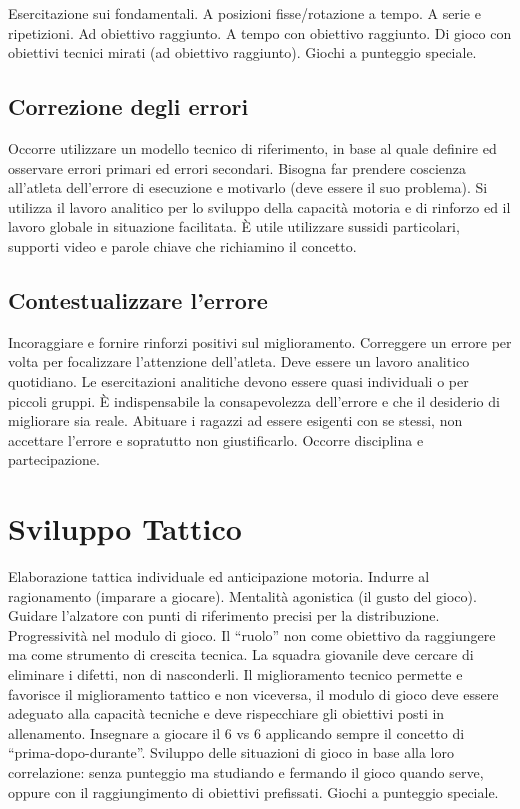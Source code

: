 Esercitazione sui fondamentali.
A posizioni fisse/rotazione a tempo.
A serie e ripetizioni.
Ad obiettivo raggiunto.
A tempo con obiettivo raggiunto.
Di gioco con obiettivi tecnici mirati (ad obiettivo raggiunto).
Giochi a punteggio speciale.

\subsection{Correzione degli errori}
Occorre utilizzare un modello tecnico di riferimento, in base al quale definire ed osservare errori primari ed errori secondari. Bisogna far prendere coscienza all'atleta dell'errore di esecuzione e motivarlo (deve essere il suo problema). Si utilizza il lavoro analitico per lo sviluppo della capacità motoria e di rinforzo ed il lavoro globale in situazione facilitata.
\`E utile utilizzare sussidi particolari, supporti video e parole chiave che richiamino il concetto.

\subsection{Contestualizzare l'errore}
Incoraggiare e fornire rinforzi positivi sul miglioramento. Correggere un errore per volta per focalizzare l'attenzione dell'atleta. Deve essere un lavoro analitico quotidiano.
Le esercitazioni analitiche devono essere quasi individuali o per piccoli gruppi.
\`E indispensabile la consapevolezza dell'errore e che il desiderio di migliorare sia reale.
Abituare i ragazzi ad essere esigenti con se stessi, non accettare l'errore e sopratutto non giustificarlo. Occorre disciplina e partecipazione.

\section{Sviluppo Tattico}
Elaborazione tattica individuale ed anticipazione motoria.
Indurre al ragionamento (imparare a giocare).
Mentalità agonistica (il gusto del gioco).
Guidare l'alzatore con punti di riferimento precisi per la distribuzione.
Progressività nel modulo di gioco.
Il “ruolo” non come obiettivo da raggiungere ma come strumento di crescita tecnica.
La squadra giovanile deve cercare di eliminare i difetti, non di nasconderli.
Il miglioramento tecnico permette e favorisce il miglioramento tattico e non viceversa, il modulo di gioco deve essere adeguato alla capacità tecniche e deve rispecchiare gli obiettivi posti in allenamento.
Insegnare a giocare il 6 vs 6 applicando sempre il concetto di “prima-dopo-durante”.
Sviluppo delle situazioni di gioco in base alla loro correlazione: senza punteggio ma studiando e fermando il gioco quando serve, oppure con il raggiungimento di obiettivi prefissati.
Giochi a punteggio speciale.

